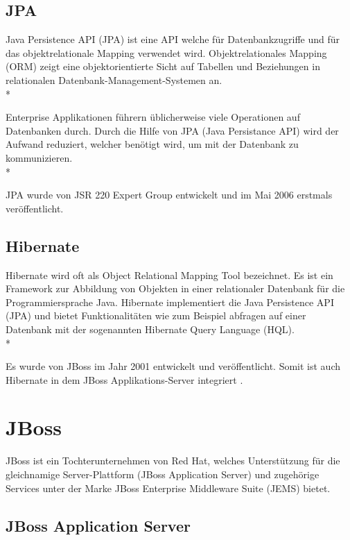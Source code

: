 \subsection{JPA}
\author{David Ignjatovic} 

Java Persistence API (JPA) ist eine API welche für Datenbankzugriffe und für das objektrelationale Mapping verwendet wird. 
Objektrelationales Mapping (ORM) zeigt eine objektorientierte Sicht auf Tabellen und Beziehungen in relationalen Datenbank-Management-Systemen an.  \\*

Enterprise Applikationen führern üblicherweise viele Operationen auf Datenbanken durch.
Durch die Hilfe von JPA (Java Persistance API) wird der Aufwand reduziert, welcher benötigt wird, um mit der Datenbank zu kommunizieren. \\* \cite{JPA}

JPA wurde von JSR 220 Expert Group entwickelt und im Mai 2006 erstmals veröffentlicht.


\subsection{Hibernate}
\author{David Ignjatovic}

Hibernate wird oft als Object Relational Mapping Tool bezeichnet. Es ist ein Framework zur Abbildung von Objekten in einer relationaler Datenbank für die Programmiersprache Java.
Hibernate implementiert die Java Persistence API (JPA) und bietet Funktionalitäten wie zum Beispiel abfragen auf einer Datenbank mit der sogenannten Hibernate Query Language (HQL). \\*

Es wurde von JBoss im Jahr 2001 entwickelt und veröffentlicht. Somit ist auch Hibernate in dem JBoss Applikations-Server integriert .\cite{Hibernate}

\section{JBoss}
\author{David Ignjatovic}

JBoss ist ein Tochterunternehmen von Red Hat, welches Unterstützung für die gleichnamige Server-Plattform (JBoss Application Server) 
und zugehörige Services unter der Marke JBoss Enterprise Middleware Suite (JEMS) bietet. \cite{JBoss}

\subsection{JBoss Application Server}

